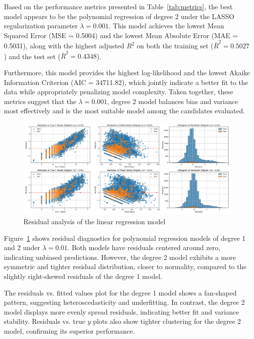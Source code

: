 \documentclass[12pt]{article}
\begin{document}
Based on the performance metrics presented in Table~\ref{tab:metrics}, 
the best model appears to be the polynomial regression of degree 2 under 
the LASSO regularization parameter $\lambda = 0.001$. This model achieves 
the lowest Mean Squared Error (MSE = 0.5004) and the lowest Mean Absolute Error 
(MAE = 0.5031), along with the highest adjusted $R^2$ on both the training set 
($\bar{R}^2 = 0.5027$) and the test set ($\bar{R}^2 = 0.4348$). 

Furthermore, this model provides the highest log-likelihood and the lowest Akaike Information
Criterion (AIC = 34711.82), which jointly indicate a better fit to the data while appropriately
penalizing model complexity. Taken together, these metrics suggest that the $\lambda = 0.001$,
degree 2 model balances bias and variance most effectively and is the most suitable model 
among the candidates evaluated.

\begin{figure}[!h]
    \centering
    \includegraphics[width=1\textwidth]{../results/linear_residuals_analysis.png}
    \caption{Residual analysis of the linear regression model}
    \label{fig:linear_residuals}
\end{figure}


Figure~\ref{fig:linear_residuals} shows residual diagnostics for polynomial 
regression models of degree 1 and 2 under $\lambda = 0.01$.
 Both models have residuals centered around zero, indicating unbiased predictions.
  However, the degree 2 model exhibits a more symmetric and tighter residual distribution,
   closer to normality, compared to the slightly right-skewed residuals of the degree 1 model.

The residuals vs. fitted values plot for the degree 1 model shows a fan-shaped pattern, 
suggesting heteroscedasticity and underfitting. In contrast, the degree 2 model displays more 
evenly spread residuals, indicating better fit and variance stability.
 Residuals vs. true $y$ plots also show tighter clustering for the degree 2 model, confirming its superior performance.
\end{document}
